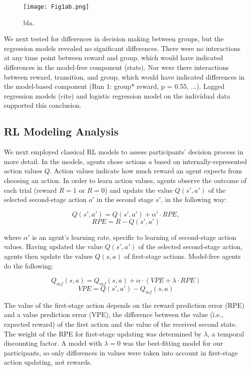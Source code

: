 \documentclass[11pt]{article} %
\begin{document}
\begin{figure}
	\texttt{[image: Fig1ab.png]}
	\caption{bla.}
	\label{Fig1}
\end{figure}

We next tested for differences in decision making between groups, but the regression models revealed no significant differences. There were no interactions at any time point between reward and group, which would have indicated differences in the model-free component (stats). Nor were there interactions between reward, transition, and group, which would have indicated differences in the model-based component (Run 1: group* reward, p = 0.55, ...). Lagged regression models (cite) and logistic regression model on the individual data supported this conclusion.

\subsection{RL Modeling Analysis}
We next employed classical RL models to assess participants' decision process in more detail. In the models, agents chose actions $a$ based on internally-represented action values $Q$. Action values indicate how much reward an agent expects from choosing an action. In order to learn action values, agents observe the outcome of each trial (reward $R = 1$ or $R = 0$) and update the value $Q(s', a')$ of the selected second-stage action $a'$ in the second stage $s'$, in the following way:

\begin{equation}
Q(s', a') = Q(s', a') + \alpha' \cdot RPE,
\end{equation}
\begin{equation}
RPE = R - Q(s', a')
\end{equation}

where $ \alpha' $ is an agent's learning rate, specific to learning of second-stage action values. Having updated the value $Q(s', a')$ of the selected second-stage action, agents then update the values $Q(s, a)$ of first-stage actions. Model-free agents do the following:

\begin{equation}
Q_{mf}(s, a) = Q_{mf}(s, a) + \alpha \cdot (VPE + \lambda \cdot RPE)
\end{equation}
\begin{equation}
VPE = Q(s', a') - Q_{mf}(s, a)
\end{equation}

The value of the first-stage action depends on the reward prediction error (RPE) and a value prediction error (VPE), the difference between the value (i.e., expected reward) of the first action and the value of the received second state. The weight of the RPE for first-stage updating was determined by $ \lambda $, a temporal discounting factor. A model with $ \lambda = 0 $ was the best-fitting model for our participants, so only differences in values were taken into account in first-stage action updating, not rewards.
\end{document}
